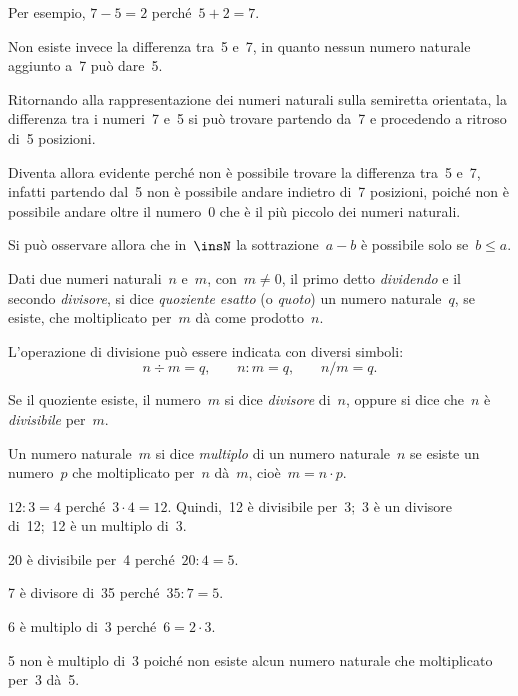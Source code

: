 Per esempio, $7-5=2$ perché~$5+2=7$.

Non esiste invece la differenza tra~5 e~7, in quanto nessun numero naturale aggiunto a~7
può dare~5.

Ritornando alla rappresentazione dei numeri naturali sulla semiretta orientata, la
differenza tra i numeri~7 e~5 si può trovare partendo da~7 e procedendo a ritroso di~5
posizioni.



Diventa allora evidente perché non è possibile trovare la differenza tra~5 e~7, infatti
partendo dal~5 non è possibile andare indietro di~7 posizioni, poiché non è possibile
andare oltre il numero~0 che è il più piccolo dei numeri naturali.



Si può osservare allora che in~$\insN$ la sottrazione~$a - b$ è possibile solo se~$b\leq a$.

\begin{definizione}
Dati due numeri naturali~$n$ e~$m$, con~$m\neq0$, il primo detto \emph{dividendo} e il secondo
\emph{divisore}, si dice \emph{quoziente esatto} (o \emph{quoto}) un numero naturale~$q$, se esiste, che moltiplicato
per~$m$ dà come prodotto~$n$.
\end{definizione}

L'operazione di divisione può essere indicata con diversi simboli:
\[n \div m=q\text{,}\qquad n : m=q\text{,}\qquad n/m=q.\]

Se il quoziente esiste, il numero~$m$ si dice \emph{divisore} di~$n$, oppure si dice che~$n$ è \emph{divisibile} per~$m$.

\begin{definizione}
Un numero naturale~$m$ si dice \emph{multiplo} di un numero naturale~$n$ se esiste un numero~$p$
che moltiplicato per~$n$ dà~$m$, cioè~$m=n\cdot p$.
\end{definizione}
\begin{exrig}

 \begin{esempio}
$12:3=4$ perché~$3\cdot 4=12$. Quindi,~12 è divisibile per~3;~3 è un divisore di~12;~12 è un multiplo di~3.
 \end{esempio}

 \begin{esempio}
20 è divisibile per~4 perché~$20:4=5$.
 \end{esempio}

 \begin{esempio}
7 è divisore di~35 perché~$35:7=5$.
 \end{esempio}

 \begin{esempio}
6 è multiplo di~3 perché~$6=2\cdot 3$.
 \end{esempio}

 \begin{esempio}
5 non è multiplo di~3 poiché non esiste alcun numero naturale che moltiplicato per~3 dà~5.
 \end{esempio}
\end{exrig}

